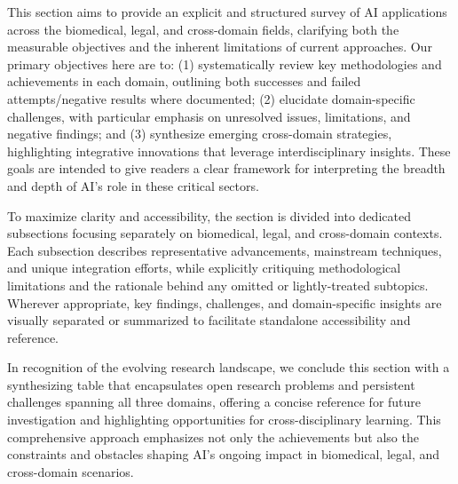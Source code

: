 \documentclass[sigconf]{acmart}
\begin{document}
This section aims to provide an explicit and structured survey of AI applications across the biomedical, legal, and cross-domain fields, clarifying both the measurable objectives and the inherent limitations of current approaches. Our primary objectives here are to: (1) systematically review key methodologies and achievements in each domain, outlining both successes and failed attempts/negative results where documented; (2) elucidate domain-specific challenges, with particular emphasis on unresolved issues, limitations, and negative findings; and (3) synthesize emerging cross-domain strategies, highlighting integrative innovations that leverage interdisciplinary insights. These goals are intended to give readers a clear framework for interpreting the breadth and depth of AI's role in these critical sectors.

To maximize clarity and accessibility, the section is divided into dedicated subsections focusing separately on biomedical, legal, and cross-domain contexts. Each subsection describes representative advancements, mainstream techniques, and unique integration efforts, while explicitly critiquing methodological limitations and the rationale behind any omitted or lightly-treated subtopics. Wherever appropriate, key findings, challenges, and domain-specific insights are visually separated or summarized to facilitate standalone accessibility and reference.

In recognition of the evolving research landscape, we conclude this section with a synthesizing table that encapsulates open research problems and persistent challenges spanning all three domains, offering a concise reference for future investigation and highlighting opportunities for cross-disciplinary learning. This comprehensive approach emphasizes not only the achievements but also the constraints and obstacles shaping AI's ongoing impact in biomedical, legal, and cross-domain scenarios.
\end{document}
